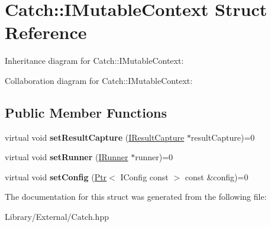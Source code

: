 \hypertarget{struct_catch_1_1_i_mutable_context}{}\section{Catch\+:\+:I\+Mutable\+Context Struct Reference}
\label{struct_catch_1_1_i_mutable_context}


Inheritance diagram for Catch\+:\+:I\+Mutable\+Context\+:


Collaboration diagram for Catch\+:\+:I\+Mutable\+Context\+:
\subsection*{Public Member Functions}
\begin{DoxyCompactItemize}
\item 
\hypertarget{struct_catch_1_1_i_mutable_context_a4a80afd0525b7def21bee8d9b48f2d39}{}virtual void {\bfseries set\+Result\+Capture} (\hyperlink{struct_catch_1_1_i_result_capture}{I\+Result\+Capture} $\ast$result\+Capture)=0\label{struct_catch_1_1_i_mutable_context_a4a80afd0525b7def21bee8d9b48f2d39}

\item 
\hypertarget{struct_catch_1_1_i_mutable_context_af2e53b1dea4527a2587cff266a730f6e}{}virtual void {\bfseries set\+Runner} (\hyperlink{struct_catch_1_1_i_runner}{I\+Runner} $\ast$runner)=0\label{struct_catch_1_1_i_mutable_context_af2e53b1dea4527a2587cff266a730f6e}

\item 
\hypertarget{struct_catch_1_1_i_mutable_context_a04ae4f4219a481a7bf658d9fd445bc1d}{}virtual void {\bfseries set\+Config} (\hyperlink{class_catch_1_1_ptr}{Ptr}$<$ I\+Config const  $>$ const \&config)=0\label{struct_catch_1_1_i_mutable_context_a04ae4f4219a481a7bf658d9fd445bc1d}

\end{DoxyCompactItemize}


The documentation for this struct was generated from the following file\+:\begin{DoxyCompactItemize}
\item 
Library/\+External/Catch.\+hpp\end{DoxyCompactItemize}
